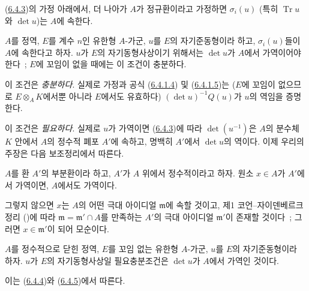 
\begin{corollary}[6.4.4]
\label{II.6.4.4-ko}
(\hyperref[II.6.4.3-ko]{6.4.3})의 가정 아래에서, 더 나아가 $A$가
정규환이라고 가정하면 $\sigma_i(u)$ (특히 $\operatorname{Tr}u$와
$\det u$)는 $A$에 속한다.
\end{corollary}

\begin{proposition}[6.4.5]
\label{II.6.4.5-ko}
$A$를 정역, $E$를 계수 $n$인 유한형 $A$-가군, $u$를 $E$의
자기준동형이라 하고, $\sigma_i(u)$들이 $A$에 속한다고 하자. $u$가
$E$의 자기동형사상이기 위해서는 $\det u$가 $A$에서 가역이어야 한다~;
$E$에 꼬임이 없을 때에는 이 조건이 충분하다.
\end{proposition}

이 조건은 \emph{충분하다}. 실제로 가정과 공식
(\hyperref[II.6.4.1.4-ko]{6.4.1.4}) 및
(\hyperref[II.6.4.1.5-ko]{6.4.1.5})는 ($E$에 꼬임이 없으므로
$E\otimes_AK$에서뿐 아니라 $E$에서도 유효하다)
$(\det u)^{-1}Q(u)$가 $u$의 역임을 증명한다.

이 조건은 \emph{필요하다}. 실제로 $u$가 가역이면
(\hyperref[II.6.4.3-ko]{6.4.3})에 따라 $\det(u^{-1})$은 $A$의
분수체 $K$ 안에서 $A$의 정수적 폐포 $A'$에 속하고, 명백히 $A'$에서
$\det u$의 역이다. 이제 우리의 주장은 다음 보조정리에서 따른다.

\begin{lemma}[6.4.5.1]
\label{II.6.4.5.1-ko}
$A$를 환 $A'$의 부분환이라 하고, $A'$가 $A$ 위에서 정수적이라고 하자.
원소 $x\in A$가 $A'$에서 가역이면, $A$에서도 가역이다.
\end{lemma}

그렇지 않으면 $x$는 $A$의 어떤 극대 아이디얼 $\mathfrak{m}$에 속할
것이고, 제1 코언--자이덴베르크 정리
(\cite[t.~I, p.~257, th.~3]{I-13})에 따라
$\mathfrak{m}=\mathfrak{m}'\cap A$를 만족하는 $A'$의 극대 아이디얼
$\mathfrak{m}'$이 존재할 것이다~; 그러면 $x\in\mathfrak{m}'$이 되어
모순이다.

\begin{corollary}[6.4.6]
\label{II.6.4.6-ko}
$A$를 정수적으로 닫힌 정역, $E$를 꼬임 없는 유한형 $A$-가군,
$u$를 $E$의 자기준동형이라 하자. $u$가 $E$의 자기동형사상일
필요충분조건은 $\det u$가 $A$에서 가역인 것이다.
\end{corollary}

이는 (\hyperref[II.6.4.4-ko]{6.4.4})와
(\hyperref[II.6.4.5-ko]{6.4.5})에서 따른다.

